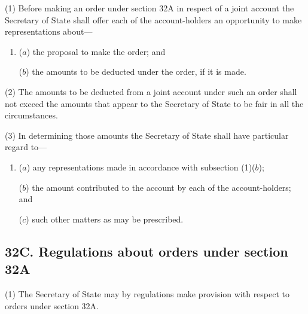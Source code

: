 \documentclass[a4paper]{article}
\begin{document}
(1) Before making an order under section 32A in respect of a joint account 
the Secretary of State shall offer each of the account-holders an opportunity to make representations about---
\begin{enumerate}\item[]
($a$) the proposal to make the order; and

($b$) the amounts to be deducted under the order, if it is made.
\end{enumerate}

(2)
The amounts to be deducted from a joint account under such an order shall not exceed the amounts that appear to the Secretary of State to be fair in all the circumstances.

(3)
In determining those amounts the Secretary of State shall have particular regard to---
\begin{enumerate}\item[]
($a$) any representations made in accordance with subsection (1)($b$);

($b$) the amount contributed to the account by each of the account-holders; and

($c$) such other matters as may be prescribed.
\end{enumerate}


\subsection{32C. Regulations about orders under section 32A}

(1) The Secretary of State may by regulations make provision with respect
to orders under section 32A.
\end{document}

